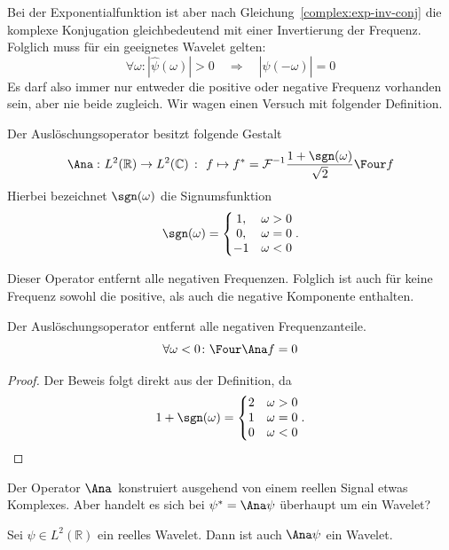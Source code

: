Bei der Exponentialfunktion ist aber nach Gleichung~\ref{complex:exp-inv-conj} die komplexe Konjugation gleichbedeutend mit einer Invertierung der Frequenz.
Folglich muss für ein geeignetes Wavelet gelten:
\[
	\forall \omega \colon |\hat\psi(\omega)| > 0 
	\quad\Rightarrow\quad
	|\hat\psi(-\omega)| = 0 
\]
Es darf also immer nur entweder die positive oder negative Frequenz vorhanden sein, aber nie beide zugleich.
Wir wagen einen Versuch mit folgender Definition.
\begin{definition}
	Der Auslöschungsoperator besitzt folgende Gestalt
		\[\Ana\, \colon L^2(\mathbb R) \to L^2(\mathbb C)
		~\colon~
		f \mapsto f^\ast = \mathcal{F}^{-1}\frac{1+\sgn(\omega)}{\sqrt 2}\Four f\]
	Hierbei bezeichnet $\sgn(\omega)$ die Signumsfunktion
	\[\sgn(\omega) = \left\lbrace\begin{matrix} 1, & \omega > 0 \\ 0, &\omega = 0 \\ -1 & \omega < 0 \end{matrix}\right..\]
\end{definition}
Dieser Operator entfernt alle negativen Frequenzen.
Folglich ist auch für keine Frequenz sowohl die positive, als auch die negative Komponente enthalten.
\begin{lemma}
	Der Auslöschungsoperator entfernt alle negativen Frequenzanteile.
	\[\forall \omega < 0 \colon \Four\Ana f = 0\]
\end{lemma}
\begin{proof}
	Der Beweis folgt direkt aus der Definition, da
	\[
		1+\sgn(\omega) = 
		\left\lbrace\begin{matrix}
		2 & \omega > 0\\
		1 & \omega = 0\\
		0 & \omega < 0
		\end{matrix}\right..\qedhere
	\]
\end{proof}
Der Operator $\Ana\,$ konstruiert ausgehend von einem reellen Signal etwas Komplexes.
Aber handelt es sich bei $\psi^\ast = \Ana\psi$ überhaupt um ein Wavelet?

\begin{satz}
	Sei $\psi \in L^2(\mathbb R)$ ein reelles Wavelet.
	Dann ist auch $\Ana\psi$ ein Wavelet.
\end{satz}

